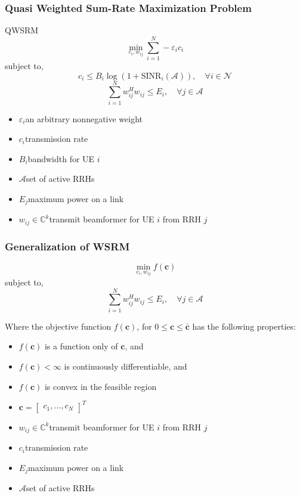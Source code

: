 \documentclass[usenames,dvipsnames]{beamer}
\begin{document}
\begin{frame}
  \frametitle{Quasi Weighted Sum-Rate Maximization Problem}
  \begin{exampleblock}{QWSRM}
    \[
      \min_{c_{i},w_{ij}} \sum_{i=1}^{N}-\varepsilon_{i}c_{i}
    \]
    subject to,
    \[
      c_{i} \leq B_{i}\log(1+\text{SINR}_{i}(\mathcal{A})),\quad \forall i\in \mathcal{N}
    \]
    \[
      \sum_{i=1}^{N}w_{ij}^{H}w_{ij}\leq E_{i},\quad \forall j\in \mathcal{A}
    \]
  \end{exampleblock}
  \begin{itemize}
    \item $\varepsilon_{i}$\quad an arbitrary nonnegative weight
    \item $c_{i}$\quad transmission rate
    \item $B_{i}$\qquad bandwidth for UE $i$
    \item $\mathcal{A}$\qquad set of active RRHs
    \item $E_{j}$\quad maximum power on a link
    \item $w_{ij}\in\mathbb{C}^{k}$\quad transmit beamformer for UE $i$ from RRH $j$
  \end{itemize}
\end{frame}

\begin{frame}
  \frametitle{Generalization of WSRM}
  \vspace*{-.5\baselineskip}
  \begin{exampleblock}{}
    \[
      \min_{c_{i},w_{ij}} f(\mathbf{c})
    \]
    subject to,
    \[
      \sum_{i=1}^{N}w_{ij}^{H}w_{ij}\leq E_{i},\quad \forall j\in \mathcal{A}
    \]
  \end{exampleblock}
  Where the objective function $f(\mathbf{c})$, for $0\leq\mathbf{c}\leq\bar{\mathbf{c}}$ has the following properties:
  \begin{itemize}
    \item $f(\mathbf{c})$ is a function only of $\mathbf{c}$, and
    \item $f(\mathbf{c})<\infty$ is continuously differentiable, and
    \item $f(\mathbf{c})$ is convex in the feasible region
    \item $\mathbf{c} = \begin{bmatrix}c_{1},\dots,c_{N}\end{bmatrix}^T$
    \item $w_{ij}\in\mathbb{C}^{k}$\quad transmit beamformer for UE $i$ from RRH $j$
    \item $c_{i}$\qquad transmission rate
    \item $E_{j}$\qquad maximum power on a link
    \item $\mathcal{A}$\qquad set of active RRHs
  \end{itemize}
\end{frame}
\end{document}

